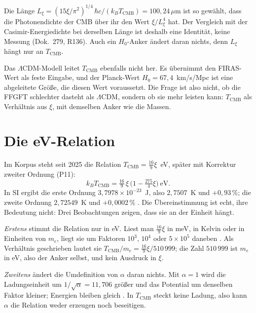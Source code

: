 Die Länge $L_\xi=(15\xi/\pi^2)^{1/4}\,\hbar c/(k_BT_{\mathrm{CMB}})=100{,}24\,\mu$m ist so
gewählt, dass die Photonendichte der CMB über ihr den Wert $\xi/L_\xi^4$ hat. Der Vergleich mit
der Casimir-Energiedichte bei derselben Länge ist deshalb eine Identität, keine Messung
(Dok.~279, R136). Auch ein $H_0$-Anker ändert daran nichts, denn $L_\xi$ hängt nur an
$T_{\mathrm{CMB}}$.

Das $\Lambda$CDM-Modell leitet $T_{\mathrm{CMB}}$ ebenfalls nicht her. Es übernimmt den
FIRAS-Wert als feste Eingabe, und der Planck-Wert $H_0=67{,}4$~km/s/Mpc ist eine abgeleitete Größe,
die diesen Wert voraussetzt. Die Frage ist also nicht, ob die FFGFT schlechter dasteht als
$\Lambda$CDM, sondern ob sie mehr leisten kann: $T_{\mathrm{CMB}}$ als Verhältnis aus $\xi$, mit
demselben Anker wie die Massen.

\section{Die eV-Relation}

Im Korpus steht seit 2025 die Relation $T_{\mathrm{CMB}}=\frac{16}{9}\xi$~eV, später mit
Korrektur zweiter Ordnung (P11):
\begin{equation}
k_BT_{\mathrm{CMB}}=\tfrac{16}{9}\,\xi\,\bigl(1-\tfrac{275}{4}\xi\bigr)\ \mathrm{eV}.
\end{equation}
In SI ergibt die erste Ordnung $3{,}7978\times10^{-23}$~J, also $2{,}7507$~K und $+0{,}93\,\%$; die
zweite Ordnung $2{,}72549$~K und $+0{,}0002\,\%$ \KM. Die Übereinstimmung ist echt, ihre Bedeutung
nicht: Drei Beobachtungen zeigen, dass sie an der Einheit hängt.

\emph{Erstens} stimmt die Relation nur in eV. Liest man $\frac{16}{9}\xi$ in meV, in Kelvin oder
in Einheiten von $m_e$, liegt sie um Faktoren $10^3$, $10^4$ oder $5\times10^5$ daneben \KM. Als
Verhältnis geschrieben lautet sie $T_{\mathrm{CMB}}/m_e=\frac{16}{9}\xi/510\,999$; die Zahl
$510\,999$ ist $m_e$ in eV, also der Anker selbst, und kein Ausdruck in $\xi$.

\emph{Zweitens} ändert die Umdefinition von $\alpha$ daran nichts. Mit $\alpha=1$ wird die
Ladungseinheit um $1/\sqrt\alpha=11{,}706$ größer und das Potential um denselben Faktor kleiner;
Energien bleiben gleich \BM. In $T_{\mathrm{CMB}}$ steckt keine Ladung, also kann $\alpha$ die
Relation weder erzeugen noch beseitigen.


